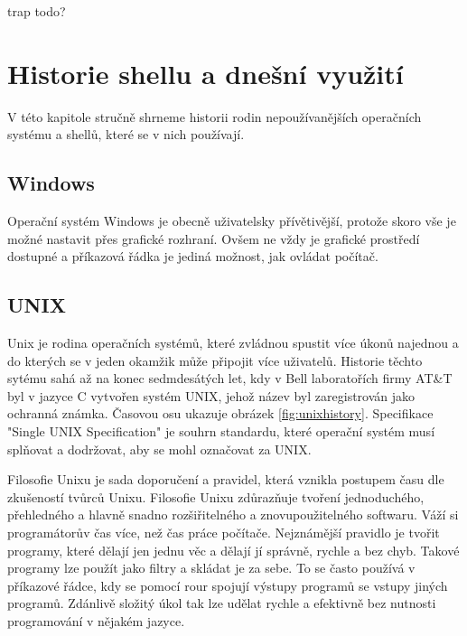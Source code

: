 \documentclass[thesis=M,czech]{FITthesis}[2012/06/26]
\begin{document}
trap todo?

\chapter{Historie shellu a dnešní využití}

V této kapitole stručně shrneme historii rodin nepoužívanějších operačních systému a shellů, které se v nich používají. 


\section{Windows}


Operační systém Windows je obecně uživatelsky přívětivější, protože skoro vše je možné nastavit přes grafické rozhraní. Ovšem ne vždy je grafické prostředí dostupné a příkazová řádka je jediná možnost, jak ovládat počítač.


\section{UNIX}

Unix je rodina operačních systémů, které zvládnou spustit více úkonů najednou a do kterých se v jeden okamžik může připojit více uživatelů. Historie těchto sytému sahá až na konec sedmdesátých let, kdy v Bell laboratořích firmy AT\&T byl v jazyce C vytvořen systém UNIX, jehož název byl zaregistrován jako ochranná známka. Časovou osu ukazuje obrázek \ref{fig:unixhistory}. Specifikace "Single UNIX Specification" je souhrn standardu, které operační systém musí splňovat a dodržovat, aby se mohl označovat za UNIX.

Filosofie Unixu je sada doporučení a pravidel, která vznikla postupem času dle zkušeností tvůrců Unixu. Filosofie Unixu zdůrazňuje tvoření jednoduchého, přehledného a hlavně snadno rozšiřitelného a znovupoužitelného softwaru. Váží si programátorův čas více, než čas práce počítače. Nejznámější pravidlo je tvořit programy, které dělají jen jednu věc a dělají jí správně, rychle a bez chyb. Takové programy lze použít jako filtry a skládat je za sebe. To se často používá v příkazové řádce, kdy se pomocí rour spojují výstupy programů se vstupy jiných programů. Zdánlivě složitý úkol tak lze udělat rychle a efektivně bez nutnosti programování v nějakém jazyce.
\end{document}
